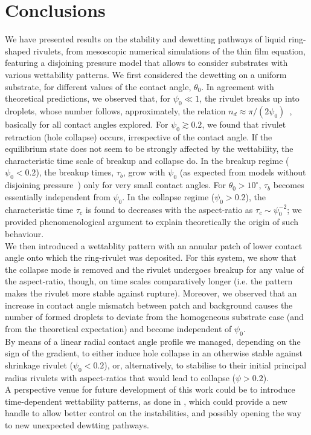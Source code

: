 \documentclass[twoside,twocolumn,9pt]{article}
\begin{document}
\section{Conclusions}\label{sec:conclu}
We have presented results on the stability and dewetting pathways of liquid ring-shaped rivulets, from mesoscopic numerical simulations of the thin film equation, featuring a disjoining pressure model that allows to consider substrates with various wettability patterns. 
We first considered the dewetting on a uniform substrate, for different values of the contact angle, $\theta_0$. 
In agreement with theoretical predictions, we observed that, for $\psi_0 \ll 1$, the rivulet breaks up into droplets, whose number follows, approximately, the relation $n_d \approx \pi/(2\psi_0)$~\cite{gonzalezStabilityLiquidRing2013}, basically for all contact angles explored.
For $\psi_0 \gtrsim 0.2$, we found that rivulet retraction (hole collapse) occurs, irrespective of the contact angle. 
If the equilibrium state does not seem to be strongly affected by the wettability, the characteristic time scale of breakup and collapse do. 
In the breakup regime ($\psi_0 < 0.2$), the breakup times, $\tau_b$, grow with $\psi_0$ (as expected from models without disjoining pressure~\cite{gonzalezStabilityLiquidRing2013}) only for very small contact angles. 
For $\theta_0 > 10^{\circ}$, $\tau_b$ becomes essentially independent from $\psi_0$. 
In the collapse regime ($\psi_0 > 0.2$), the characteristic time $\tau_c$ is found to decreases with the aspect-ratio as $\tau_c  \sim \psi_0^{-2}$; we provided phenomenological argument to explain theoretically the origin of such behaviour.\\
We then introduced a wettablity pattern with an annular patch of lower contact angle onto which the ring-rivulet was deposited. For this system, we show that the collapse mode is removed and the rivulet undergoes breakup for any value of the aspect-ratio, though, on time scales comparatively longer (i.e. the pattern makes the rivulet more stable against rupture). 
Moreover, we observed that an increase in contact angle mismatch between patch and background causes the number of formed droplets to deviate from the homogeneous substrate case (and from the theoretical expectation) and become independent of $\psi_0$.\\
By means of a linear radial contact angle profile we managed, depending on the sign of the gradient, to either induce hole collapse in an otherwise stable against shrinkage rivulet ($\psi_0<0.2$), or, alternatively, to stabilise to their initial principal radius rivulets with aspect-ratios that would lead to collapse ($\psi>0.2$). \\
A perspective venue for future development of this work could be to introduce time-dependent wettability patterns, as done in \cite{zitzControllingDewettingMorphologies2023}, which could provide a new handle to allow better control on the instabilities, and possibly opening the way to new unexpected dewtting pathways.
\end{document}
